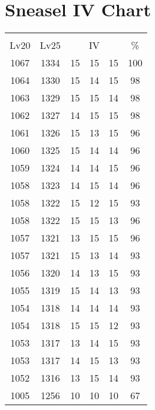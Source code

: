 \documentclass{article}%
\begin{document}
%
\normalsize%
\section{Sneasel IV Chart}%
\label{sec:Sneasel IV Chart}%
\renewcommand{\arraystretch}{1.5}%
\begin{tabular}{|c|c|c|c|c|c|}%
\hline%
\multicolumn{6}{|c|}{\textcolor{white}{ 
\linebreak{Sneasel}
}%
\cellcolor{black}}\\%
\multicolumn{1}{|c}{Lv20}&\multicolumn{1}{c|}{Lv25}&\multicolumn{3}{c|}{IV}&\multicolumn{1}{|c|}{\%}\\%
\hline%
\rowcolor{color100}%
1067&1334&15&15&15&100\\%
\hline%
\rowcolor{color98}%
1064&1330&15&14&15&98\\%
\hline%
\rowcolor{color98}%
1063&1329&15&15&14&98\\%
\hline%
\rowcolor{color98}%
1062&1327&14&15&15&98\\%
\hline%
\rowcolor{color96}%
1061&1326&15&13&15&96\\%
\hline%
\rowcolor{color96}%
1060&1325&15&14&14&96\\%
\hline%
\rowcolor{color96}%
1059&1324&14&14&15&96\\%
\hline%
\rowcolor{color96}%
1058&1323&14&15&14&96\\%
\hline%
\rowcolor{color93}%
1058&1322&15&12&15&93\\%
\hline%
\rowcolor{color96}%
1058&1322&15&15&13&96\\%
\hline%
\rowcolor{color96}%
1057&1321&13&15&15&96\\%
\hline%
\rowcolor{color93}%
1057&1321&15&13&14&93\\%
\hline%
\rowcolor{color93}%
1056&1320&14&13&15&93\\%
\hline%
\rowcolor{color93}%
1055&1319&15&14&13&93\\%
\hline%
\rowcolor{color93}%
1054&1318&14&14&14&93\\%
\hline%
\rowcolor{color93}%
1054&1318&15&15&12&93\\%
\hline%
\rowcolor{color93}%
1053&1317&13&14&15&93\\%
\hline%
\rowcolor{color93}%
1053&1317&14&15&13&93\\%
\hline%
\rowcolor{color93}%
1052&1316&13&15&14&93\\%
\hline%
\rowcolor{color91}%
1005&1256&10&10&10&67\\%
\end{tabular}

%
\end{document}
